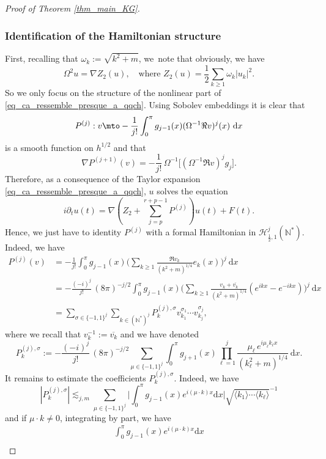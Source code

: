 \begin{proof}[Proof of Theorem \ref{thm_main_KG}]
\subsubsection*{Identification of the Hamiltonian structure}
First, recalling that $\omega_k:= \sqrt{k^2+m}$, we~note that obviously, we have
\[
\Omega^2 u = \nabla Z_2(u), \quad \text{where } Z_2(u) = \frac12 \sum_{k\geq 1} \omega_k |u_k|^2.
\]
So we only focus on the structure of the nonlinear part of \eqref{eq_ca_ressemble_presque_a_qqch}. Using Sobolev embed\-dings it is clear that
\[
P^{(j)}: v\mto - \frac1{j !}\int_0^\pi g_{j-1}(x) (\Omega^{-1} \Re v)^j(x) \ \mathrm{d}x
\]
is a smooth function on $h^{1/2}$ and that
\[
\nabla P^{(j+1)}(v) = - \frac1{j !}\, \Omega^{-1}\bigl[(\Omega^{-1} \Re v)^j g_j\bigr].
\]
Therefore, as a consequence of the Taylor expansion \eqref{eq_ca_ressemble_presque_a_qqch}, $u$ solves the equation
\begin{equation}
\label{eq_ca_ressemble_a_ca}
i\partial_t u(t) = \nabla (Z_2 + \sum_{j=p}^{r+p-1} P^{(j)}) u(t) + F(t).
\end{equation}
Hence, we just have to identity $P^{(j)}$ with a formal Hamiltonian in $\mathscr{H}_{\frac12,1}^j(\mathbb{N}^*)$.
Indeed, we have
\begin{align*}
P^{(j)}(v) &= -\frac1{j !}\int_0^\pi g_{j-1}(x) \biggl(\sum_{k\geq 1} \frac{\Re v_k }{(k^2+m)^{1/4}} e_k(x) \biggr)^j \ \mathrm{d}x \\
&= -\frac{(-i)^j}{j !}\, (8\pi)^{-j/2} \int_0^\pi g_{j-1}(x) \biggl(\sum_{k\geq 1} \frac{v_k + \overline{v_k}}{(k^2+m)^{1/4}} (e^{ikx} - e^{-ikx})\biggr)^j \ \mathrm{d}x \\
&= \sum_{\sigma\in \{-1,1\}^j} \sum_{k\in (\mathbb{N}^*)^j} P^{(j),\sigma}_k v_{k_1}^{\sigma_1} \cdots v_{k_j}^{\sigma_j},
\end{align*}
where we recall that $v_k^{-1}:= \overline{v_k}$ and we have denoted
\[
P^{(j),\sigma}_k:= -\frac{(-i)^j}{j !}\, (8\pi)^{-j/2} \sum_{\mu \in \{-1,1\}^j} \int_0^\pi g_{j+1}(x) \prod_{\ell=1}^j \frac{\mu_{\ell}\, e^{i\mu_{\ell}k_{\ell}x}}{(k_\ell^2+m)^{1/4}} \ \mathrm{d}x.
\]
It remains to estimate the coefficients $P^{(j),\sigma}_k$. Indeed, we have
\[
|P^{(j),\sigma}_k| \lesssim_{j,m} \sum_{\mu \in \{-1,1\}^j} \biggl| \int_0^\pi g_{j-1}(x) e^{i(\mu \cdot k) x} \mathrm{d}x \biggr| \sqrt{ \langle k_1 \rangle \cdots \langle k_\ell \rangle }^{-1}
\]
and if $\mu \cdot k \neq 0$, integrating by part, we have
\begin{multline*}
\int_0^\pi g_{j-1}(x) e^{i(\mu \cdot k) x} \mathrm{d}x\\[-8pt]

\end{multline*}
\end{proof}
